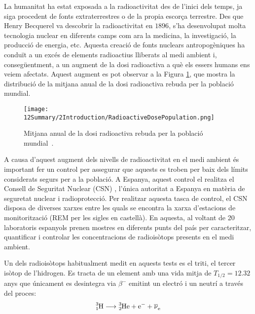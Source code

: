 La humanitat ha estat exposada a la radioactivitat des de l'inici dels temps, ja siga procedent de fonts extraterrestres o de la propia escorça terrestre. Des que Henry Becquerel va descobrir la radioactivitat en $1896$, s'ha desenvolupat molta tecnologia nuclear en diferents camps com ara la medicina, la investigació, la producció de energia, etc. Aquesta creació de fonts nuclears antropogèniques ha conduït a un excés de elements radioactius lliberats al medi ambient i, consegüentment, a un augment de la dosi radioactiva a què els essers humans ens veiem afectats. Aquest augment es pot observar a la Figura  \ref{fig:DosiRadioactiva}, que mostra la distribució de la mitjana anual de la dosi radioactiva rebuda per la població mundial.

\begin{figure}[h]
\texttt{[image: 12Summary/2Introduction/RadioactiveDosePopulation.png]}
\centering
\caption{Mitjana anual de la dosi radioactiva rebuda per la població mundial~\cite{IAEA}\label{fig:DosiRadioactiva}.}
\end{figure}

A causa d'aquest augment dels nivells de radioactivitat en el medi ambient és important fer un control per assegurar que aquests es troben per baix dels límits considerats segurs per a la població. A Espanya, aquest control el realitza el Consell de Seguritat Nuclear (CSN) \cite{CSN}, l'única autoritat a Espanya en matèria de seguretat nuclear i radioprotecció. Per realitzar aquesta tasca de control, el CSN disposa de diverses xarxes entre les quals se encontra la xarxa d'estacions de monitorització (REM per les sigles en castellà). En aquesta, al voltant de 20 laboratoris espanyols prenen mostres en diferents punts del país per caracteritzar, quantificar i controlar les concentracions de radioisòtops presents en el medi ambient.

Un dels radioisòtops habitualment medit en aquests tests es el triti, el tercer isòtop de l'hidrogen. Es tracta de un element amb una vida mitja de $T_{1/2} = 12.32$ anys que únicament es desintegra via $\beta^{-}$ emitint un electró i un neutrí a través del proces:
\begin{equation}
\ce{^{3}_{1}H} \longrightarrow \ce{^{3}_{2}He}  + \ce{e^-}  + \ce{\overline{\nu}_e}
\label{eq:DecaimentTriti}
\end{equation}


